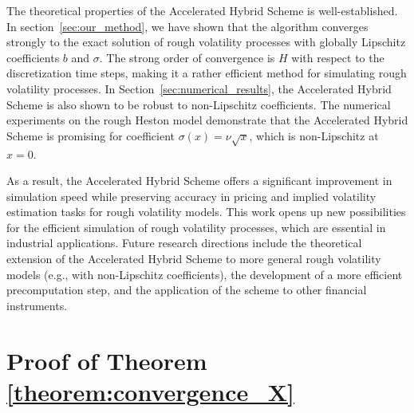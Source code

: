 \documentclass[11pt]{article}%
\theoremstyle{definition}
\begin{document}
The theoretical properties of the Accelerated Hybrid Scheme is well-established. In section~\ref{sec:our_method}, we have shown that the algorithm converges strongly to the exact solution of rough volatility processes with globally Lipschitz coefficients \(b\) and \(\sigma\). The strong order of convergence is \(H\) with respect to the discretization time steps, making it a rather efficient method for simulating rough volatility processes. In Section~\ref{sec:numerical_results}, the Accelerated Hybrid Scheme is also shown to be robust to non-Lipschitz coefficients. The numerical experiments on the rough Heston model demonstrate that the Accelerated Hybrid Scheme is promising for coefficient \(\sigma(x)=\nu\sqrt{x}\), which is non-Lipschitz at \(x=0\).

As a result, the Accelerated Hybrid Scheme offers a significant improvement in simulation speed while preserving accuracy in pricing and implied volatility estimation tasks for rough volatility models. This work opens up new possibilities for the efficient simulation of rough volatility processes, which are essential in industrial applications. Future research directions include the theoretical extension of the Accelerated Hybrid Scheme to more general rough volatility models (e.g., with non-Lipschitz coefficients), the development of a more efficient precomputation step, and the application of the scheme to other financial instruments.


\newpage





\newpage
\setcounter{section}{0}
\setcounter{subsection}{0}
\setcounter{equation}{0}
\renewcommand{\thesection}{Appendix \Alph{section}}
\renewcommand\thesubsection{\thesection.\arabic{subsection}}
\renewcommand{\theequation}{\Alph{section}.\arabic{equation}}%


\section{Proof of Theorem \ref{theorem:convergence_X}\label{Appendix_proof}}
\end{document}
